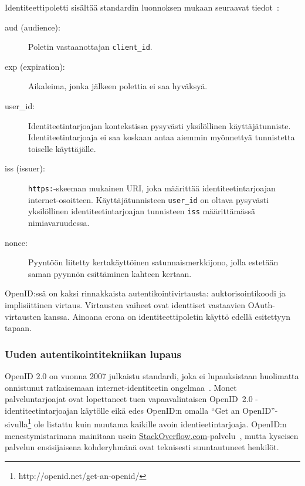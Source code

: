 \documentclass[finnish,gradu]{tktltiki}
\begin{document}
  Identiteettipoletti sisältää standardin luonnoksen mukaan seuraavat tiedot~\cite{sakimura_openid_c_nutshell_2012}:

  \begin{description}
    \item[aud (audience):] Poletin vastaanottajan \verb!client_id!.

    \item[exp (expiration):] Aikaleima, jonka jälkeen polettia ei saa hyväksyä.

    \item[user\_id:] Identiteetintarjoajan kontekstissa pysyvästi yksilöllinen käyttäjätunniste. Identiteetintarjoaja ei saa koskaan antaa aiemmin myönnettyä tunnistetta toiselle käyttäjälle.

    \item[iss (issuer):] \verb!https:!-skeeman mukainen URI, joka määrittää identiteetintarjoajan internet-osoitteen. Käyttäjätunnisteen \verb!user_id! on oltava pysyvästi yksilöllinen identiteetintarjoajan tunnisteen \verb!iss! määrittämässä nimiavaruudessa.

    \item[nonce:] Pyyntöön liitetty kertakäyttöinen satunnaismerkkijono, jolla estetään saman pyynnön esittäminen kahteen kertaan.
  \end{description}

  OpenID:ssä on kaksi rinnakkaista autentikointivirtausta: auktorisointikoodi ja implisiittinen virtaus. Virtausten vaiheet ovat identtiset vastaavien OAuth-virtausten kanssa. Ainoana erona on identiteettipoletin käyttö edellä esitettyyn tapaan.


  \subsubsection{Uuden autentikointitekniikan lupaus} %
  \label{ssub:uuden_autentikointitekniikan_lupaus}

  OpenID 2.0 on vuonna 2007 julkaistu standardi, joka ei lupauksistaan huolimatta onnistunut ratkaisemaan internet-identiteetin ongelmaa~\cite{openid_failure_gilbertson_2011, openid_failure_obasanjo_2011, openid_failure_edge_2011, openid_failure_conery_2010, openid_failure_quora_2010, openid_failure_37signals_2011}. Monet palveluntarjoajat ovat lopettaneet tuen vapaavalintaisen \mbox{OpenID 2.0} -identi\-teetin\-tarjoajan käytölle eikä edes OpenID:n omalla ``Get an OpenID''-si\-vul\-la\footnote{http://openid.net/get-an-openid/} ole listattu kuin muutama kaikille avoin identieetintarjoaja. \mbox{OpenID}:n menestymistarinana mainitaan usein \url{StackOverflow.com}-palvelu~\cite{openid_success_stackoverflow_2010, openid_failure_conery_2010}, mutta kyseisen palvelun ensisijaisena kohderyhmänä ovat teknisesti suuntautuneet henkilöt.
\end{document}
